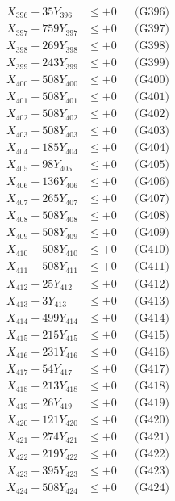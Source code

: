 \documentclass[a4paper,10pt]{article}
\begin{document}
{\begin{align}
X_{396} - 35Y_{396} &\leq +0 && \text{(G396)} \\
X_{397} - 759Y_{397} &\leq +0 && \text{(G397)} \\
X_{398} - 269Y_{398} &\leq +0 && \text{(G398)} \\
X_{399} - 243Y_{399} &\leq +0 && \text{(G399)} \\
X_{400} - 508Y_{400} &\leq +0 && \text{(G400)} \\
\allowbreak
X_{401} - 508Y_{401} &\leq +0 && \text{(G401)} \\
X_{402} - 508Y_{402} &\leq +0 && \text{(G402)} \\
X_{403} - 508Y_{403} &\leq +0 && \text{(G403)} \\
X_{404} - 185Y_{404} &\leq +0 && \text{(G404)} \\
X_{405} - 98Y_{405} &\leq +0 && \text{(G405)} \\
X_{406} - 136Y_{406} &\leq +0 && \text{(G406)} \\
X_{407} - 265Y_{407} &\leq +0 && \text{(G407)} \\
X_{408} - 508Y_{408} &\leq +0 && \text{(G408)} \\
X_{409} - 508Y_{409} &\leq +0 && \text{(G409)} \\
X_{410} - 508Y_{410} &\leq +0 && \text{(G410)} \\
\allowbreak
X_{411} - 508Y_{411} &\leq +0 && \text{(G411)} \\
X_{412} - 25Y_{412} &\leq +0 && \text{(G412)} \\
X_{413} - 3Y_{413} &\leq +0 && \text{(G413)} \\
X_{414} - 499Y_{414} &\leq +0 && \text{(G414)} \\
X_{415} - 215Y_{415} &\leq +0 && \text{(G415)} \\
X_{416} - 231Y_{416} &\leq +0 && \text{(G416)} \\
X_{417} - 54Y_{417} &\leq +0 && \text{(G417)} \\
X_{418} - 213Y_{418} &\leq +0 && \text{(G418)} \\
X_{419} - 26Y_{419} &\leq +0 && \text{(G419)} \\
X_{420} - 121Y_{420} &\leq +0 && \text{(G420)} \\
\allowbreak
X_{421} - 274Y_{421} &\leq +0 && \text{(G421)} \\
X_{422} - 219Y_{422} &\leq +0 && \text{(G422)} \\
X_{423} - 395Y_{423} &\leq +0 && \text{(G423)} \\
X_{424} - 508Y_{424} &\leq +0 && \text{(G424)} \\

\end{align}}
\end{document}
